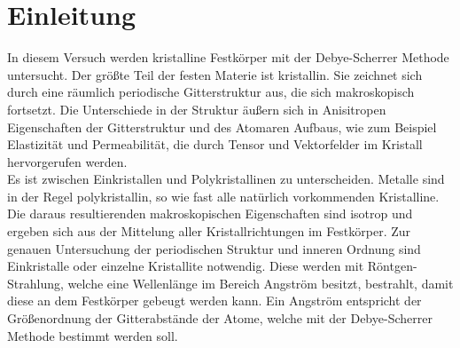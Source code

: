 \section{Einleitung}
\label{sec:Einleitung}
In diesem Versuch werden kristalline Festkörper mit der Debye-Scherrer Methode untersucht. 
Der größte Teil der festen Materie ist kristallin. 
Sie zeichnet sich durch eine räumlich periodische Gitterstruktur aus, die sich makroskopisch fortsetzt. 
Die Unterschiede in der Struktur äußern sich in Anisitropen Eigenschaften der Gitterstruktur  und des Atomaren Aufbaus, wie zum Beispiel Elastizität und Permeabilität, die durch Tensor und Vektorfelder im Kristall hervorgerufen werden.\\
Es ist zwischen Einkristallen und Polykristallinen zu unterscheiden. 
Metalle sind in der Regel polykristallin, so wie fast alle natürlich vorkommenden Kristalline.
Die daraus resultierenden makroskopischen Eigenschaften sind isotrop und ergeben sich aus der Mittelung aller Kristallrichtungen im Festkörper.
Zur genauen Untersuchung der periodischen Struktur und inneren Ordnung sind Einkristalle oder einzelne Kristallite notwendig.  
Diese werden mit Röntgen-Strahlung, welche eine Wellenlänge im Bereich Angström besitzt, bestrahlt, damit diese an dem Festkörper gebeugt werden kann.
Ein Angström entspricht der Größenordnung der Gitterabstände der Atome, welche mit der Debye-Scherrer Methode bestimmt werden soll.	